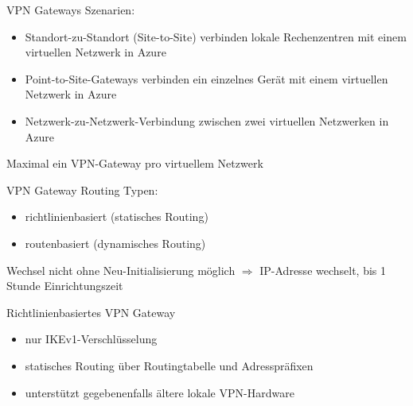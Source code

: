

\begin{flashcard}[Definition]{VPN Gateways}
    Szenarien:
    \begin{itemize}
        \item Standort-zu-Standort (Site-to-Site) verbinden lokale Rechenzentren mit einem virtuellen Netzwerk in Azure
        \item Point-to-Site-Gateways verbinden ein einzelnes Gerät mit einem virtuellen Netzwerk in Azure
        \item Netzwerk-zu-Netzwerk-Verbindung zwischen zwei virtuellen Netzwerken in Azure
    \end{itemize}

    Maximal ein VPN-Gateway pro virtuellem Netzwerk

\end{flashcard}

\begin{flashcard}[Definition]{VPN Gateway Routing}
    Typen:
    \begin{itemize}
        \item richtlinienbasiert (statisches Routing)
        \item routenbasiert (dynamisches Routing)
    \end{itemize}

    \vspace{1cm}
    Wechsel nicht ohne Neu-Initialisierung möglich\newline
    $\Rightarrow$ IP-Adresse wechselt, bis 1 Stunde Einrichtungszeit

\end{flashcard}

\begin{flashcard}[Definition]{Richtlinienbasiertes VPN Gateway}
    \begin{itemize}
        \item nur IKEv1-Verschlüsselung
        \item statisches Routing über Routingtabelle und Adresspräfixen
        \item unterstützt gegebenenfalls ältere lokale VPN-Hardware
    \end{itemize}
\end{flashcard}

